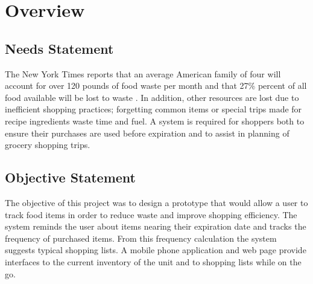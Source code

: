 \documentclass[11pt]{article} %
\begin{document}
\setcounter{page}{2}

\addtolength{\topskip}{+0.5cm}
\tableofcontents
\addtolength{\topskip}{-0.5cm}
\pagebreak
\section{Overview}
\subsection{Needs Statement}
The New York Times reports that an average American family of four will account for over 120 pounds of food waste per month and that 27\% percent of all food available will be lost to waste \cite{times}. In addition, other resources are lost due to inefficient shopping practices; forgetting common items or special trips made for recipe ingredients waste time and fuel. A system is required for shoppers both to ensure their purchases are used before expiration and to assist in planning of grocery shopping trips.
\subsection{Objective Statement}
The objective of this project was to design a prototype that would allow a user to track food items in order to reduce waste and improve shopping efficiency. The system reminds the user about items nearing their expiration date and tracks the frequency of purchased items. From this frequency calculation the system suggests typical shopping lists. A mobile phone application and web page provide interfaces to the current inventory of the unit and to shopping lists while on the go.
\end{document}
